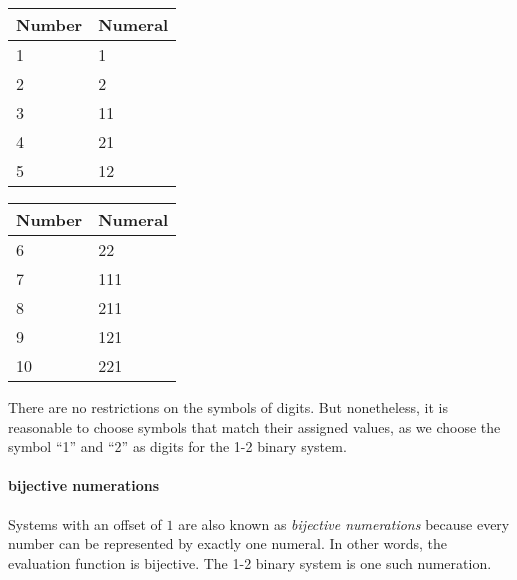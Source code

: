 \documentclass[../thesis.tex]{subfiles}
\begin{document}
\begin{center}
    \begin{adjustbox}{max width=\textwidth}
    \begin{tabular}{ | l | l |}
    \textbf{Number} & \textbf{Numeral} \\
    \hline
    1 & 1  \\
    2 & 2  \\
    3 & 11 \\
    4 & 21 \\
    5 & 12 \\
    \end{tabular}
    \quad
    \begin{tabular}{ | l | l | }
    \textbf{Number} & \textbf{Numeral} \\
    \hline
    6  & 22 \\
    7  & 111 \\
    8  & 211 \\
    9  & 121 \\
    10 & 221 \\
    \end{tabular}
    \end{adjustbox}
\end{center}

There are no restrictions on the symbols of digits.
But nonetheless, it is reasonable to choose symbols that match their assigned
values, as we choose the symbol ``1'' and ``2'' as digits for the 1-2 binary system.


\paragraph{bijective numerations}
Systems with an offset of $ 1 $ are also known as \textit{bijective numerations}
because every number can be represented by exactly one numeral. In other words,
the evaluation function is bijective. The 1-2 binary system is one such numeration.
\end{document}
